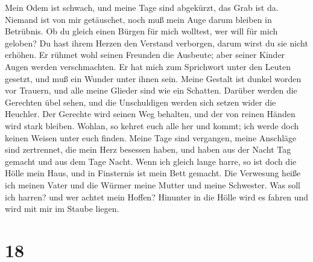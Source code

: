  Mein Odem ist schwach, und meine Tage sind abgekürzt, das
Grab ist da.  Niemand ist von mir getäuschet, noch muß mein
Auge darum bleiben in Betrübnis.  Ob du gleich einen Bürgen
für mich wolltest, wer will für mich geloben?  Du hast ihrem
Herzen den Verstand verborgen, darum wirst du sie nicht erhöhen.
 Er rühmet wohl seinen Freunden die Ausbeute; aber seiner
Kinder Augen werden verschmachten.  Er hat mich zum
Sprichwort unter den Leuten gesetzt, und muß ein Wunder unter ihnen
sein.  Meine Gestalt ist dunkel worden vor Trauern, und alle
meine Glieder sind wie ein Schatten.  Darüber werden die
Gerechten übel sehen, und die Unschuldigen werden sich setzen wider die
Heuchler.  Der Gerechte wird seinen Weg behalten, und der
von reinen Händen wird stark bleiben.  Wohlan, so kehret
euch alle her und kommt; ich werde doch keinen Weisen unter euch finden.
 Meine Tage sind vergangen, meine Anschläge sind
zertrennet, die mein Herz besessen haben,  und haben aus
der Nacht Tag gemacht und aus dem Tage Nacht.  Wenn ich
gleich lange harre, so ist doch die Hölle mein Haus, und in Finsternis
ist mein Bett gemacht.  Die Verwesung heiße ich meinen
Vater und die Würmer meine Mutter und meine Schwester.  Was
soll ich harren? und wer achtet mein Hoffen?  Hinunter in
die Hölle wird es fahren und wird mit mir im Staube liegen.

\hypertarget{section-17}{%
\section{18}\label{section-17}}


